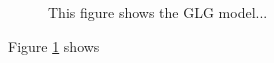 \documentclass{article}\usepackage[]{graphicx}\usepackage[]{color}
\begin{document}
\begin{figure}
\caption{This figure shows the GLG model...}
\label{fig:GLGmodelBandwidths}
\end{figure}

Figure \ref{fig:GLGmodelBandwidths} shows
\end{document}
